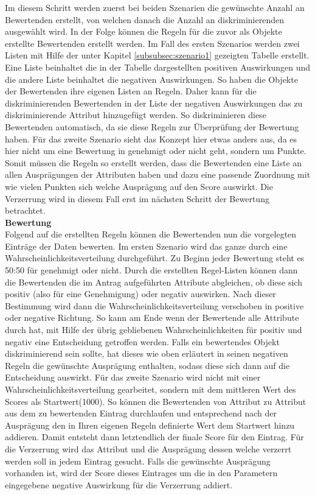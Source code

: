 \begin{onehalfspace}
Im diesem Schritt werden zuerst bei beiden Szenarien die gewünschte Anzahl an Bewertenden erstellt, von welchen danach die Anzahl an diskriminierenden ausgewählt wird. In der Folge können die Regeln für die zuvor als Objekte erstellte Bewertenden erstellt werden. Im Fall des ersten Szenarios werden zwei Listen mit Hilfe der unter Kapitel \ref{subsubsec:szenario1} gezeigten Tabelle erstellt. Eine Liste beinhaltet die in der Tabelle dargestellten positiven Auswirkungen und die andere Liste beinhaltet die negativen Auswirkungen. So haben die Objekte der Bewertenden ihre eigenen Listen an Regeln. Daher kann für die diskriminierenden Bewertenden in der Liste der negativen Auswirkungen das zu diskriminierende Attribut hinzugefügt werden. So diskriminieren diese Bewertenden automatisch, da sie diese Regeln zur Überprüfung der Bewertung haben. Für das zweite Szenario sieht das Konzept hier etwas anders aus, da es hier nicht um eine Bewertung in genehmigt oder nicht geht, sondern um Punkte. Somit müssen die Regeln so erstellt werden, dass die Bewertenden eine Liste an allen Ausprägungen der Attributen haben und dazu eine passende Zuordnung mit wie vielen Punkten sich welche Ausprägung auf den Score auswirkt. Die Verzerrung wird in diesem Fall erst im nächsten Schritt der Bewertung betrachtet.\\
\textbf{Bewertung}\\
Folgend auf die erstellten Regeln können die Bewertenden nun die vorgelegten Einträge der Daten bewerten. Im ersten Szenario wird das ganze durch eine Wahrscheinlichkeitsverteilung durchgeführt. Zu Beginn jeder Bewertung steht es 50:50 für genehmigt oder nicht. Durch die erstellten Regel-Listen können dann die Bewertenden die im Antrag aufgeführten Attribute abgleichen, ob diese sich positiv (also für eine Genehmigung) oder negativ auswirken. Nach dieser Bestimmung wird dann die Wahrscheinlichkeitsverteilung verschoben in positive oder negative Richtung. So kann am Ende wenn der Bewertende alle Attribute durch hat, mit Hilfe der übrig gebliebenen Wahrscheinlichkeiten für positiv und negativ eine Entscheidung getroffen werden. Falls ein bewertendes Objekt diskriminierend sein sollte, hat dieses wie oben erläutert in seinen negativen Regeln die gewünschte Ausprägung enthalten, sodass diese sich dann auf die Entscheidung auswirkt. Für das zweite Szenario wird nicht mit einer Wahrscheinlichkeitsverteilung gearbeitet, sondern mit dem mittleren Wert des Scores als Startwert(1000). So können die Bewertenden von Attribut zu Attribut aus dem zu bewertenden Eintrag durchlaufen und entsprechend nach der Ausprägung den in Ihren eigenen Regeln definierte Wert dem Startwert hinzu addieren. Damit entsteht dann letztendlich der finale Score für den Eintrag. Für die Verzerrung wird das Attribut und die Ausprägung dessen welche verzerrt werden soll in jedem Eintrag gesucht. Falls die gewünschte Ausprägung vorhanden ist, wird der Score dieses Eintrages um die in den Parametern eingegebene negative Auswirkung für die Verzerrung addiert.\\

\end{onehalfspace}
